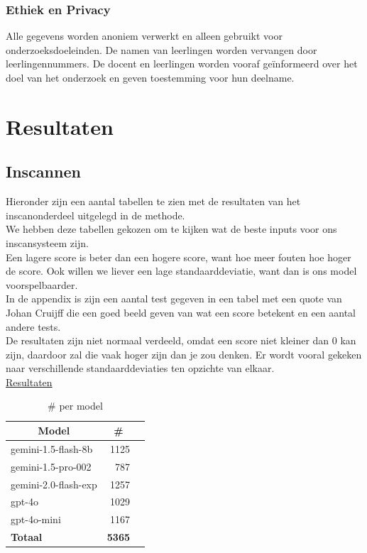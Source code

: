 \documentclass[12pt]{article}
\begin{document}
\subsubsection*{Ethiek en Privacy}
Alle gegevens worden anoniem verwerkt en alleen gebruikt voor onderzoeksdoeleinden. De namen van leerlingen worden vervangen door leerlingennummers. De docent en leerlingen worden vooraf geïnformeerd over het doel van het onderzoek en geven toestemming voor hun deelname.




\pagebreak
\section{Resultaten}
\subsection{Inscannen}
\noindent Hieronder zijn een aantal tabellen te zien met de resultaten van het inscanonderdeel uitgelegd in de methode. \\
We hebben deze tabellen gekozen om te kijken wat de beste inputs voor ons inscansysteem zijn. \\
Een lagere score is beter dan een hogere score, want hoe meer fouten hoe hoger de score. Ook willen we liever een lage standaarddeviatie, want dan is ons model voorspelbaarder. \\
In de appendix is zijn een aantal test gegeven in een tabel met een quote van Johan Cruijff die een goed beeld geven van wat een score betekent en een aantal andere tests.\\
De resultaten zijn niet normaal verdeeld, omdat een score niet kleiner dan 0 kan zijn, daardoor zal die vaak hoger zijn dan je zou denken. Er wordt vooral gekeken naar verschillende standaarddeviaties ten opzichte van elkaar. 
\\
\noindent\href{https://docs.google.com/spreadsheets/d/1wbHiG81i-UJ18s6gP3i_WtsPD-FBQTqg7AwNjN8Rm2g}{Resultaten}

\noindent\begin{table}[H]
\caption{\# per model}
\label{fig:count-model}
\begin{tabularx}{\textwidth}{X *2{r}}
    \toprule
    \multicolumn{1}{c}{\textbf{Model}} & \multicolumn{1}{c}{\textbf{\#}} \\  %
    \midrule
    gemini-1.5-flash-8b & 1125 \\
    gemini-1.5-pro-002 & 787 \\
    gemini-2.0-flash-exp & 1257 \\
    gpt-4o & 1029 \\
    gpt-4o-mini & 1167 \\
    \midrule
    \textbf{Totaal} & \textbf{5365} \\
    \bottomrule
    
\end{tabularx}%
\end{table}
\end{document}
